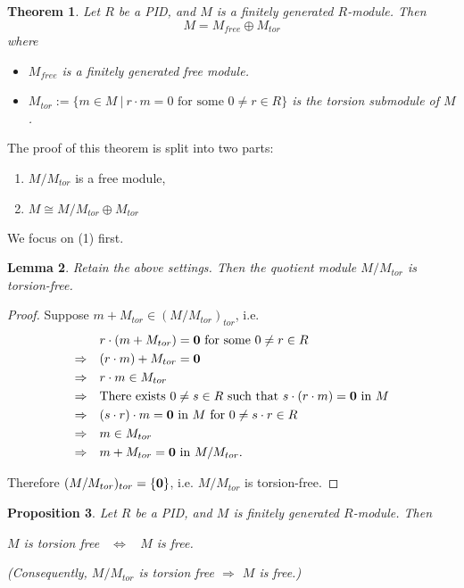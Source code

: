 \documentclass[12pt]{amsbook}
\newtheorem{theorem}{Theorem}[section]
\newtheorem{lemma}[theorem]{Lemma}
\newtheorem{proposition}[theorem]{Proposition}
\begin{document}
\begin{theorem}
    Let $R$ be a PID, and $M$ is a finitely generated $R$-module. Then
    $$M = M_{free}\oplus M_{tor}$$
    where
    \begin{itemize}
        \item $M_{free}$ is a finitely generated free module.
        \item $M_{tor}:=\{m\in M\ |\ r\cdot m=0\text{ for some }0\neq r\in R\}$ is the torsion submodule of $M$.
    \end{itemize}
\end{theorem}

The proof of this theorem is split into two parts:
\begin{enumerate}
    \item $M/M_{tor}$ is a free module,
    \item $M\cong M/M_{tor}\oplus M_{tor}$
\end{enumerate}

\medskip
We focus on (1) first. 
\begin{lemma}
Retain the above settings. Then the quotient module $M/M_{tor}$ is torsion-free.
\end{lemma}
\begin{proof}
Suppose $m+M_{tor}\in (M/M_{tor})_{tor}$, i.e.
    \begin{align*}
        &\quad r\cdot (m+M_{tor})={\bf 0}\text{ for some }0\neq r\in R\\
        \Rightarrow &\quad(r\cdot m)+M_{tor}={\bf 0}\\
        \Rightarrow &\quad r\cdot m\in M_{tor}\\
        \Rightarrow &\quad\text{There exists }0\neq s\in R\text{ such that }s\cdot(r\cdot m)={\bf 0}\text{ in }M\\
        \Rightarrow &\quad(s\cdot r)\cdot m={\bf 0}\text{ in }M\ \text{for}\ 0 \neq s\cdot r \in R\\
        \Rightarrow &\quad m\in M_{tor}\\
        \Rightarrow &\quad m+M_{tor}={\bf 0}\text{ in }M/M_{tor}.
    \end{align*}

    
    Therefore $(M/M_{tor})_{tor}=\{{\bf 0}\}$, i.e. $M/M_{tor}$ is torsion-free.
\end{proof}

\begin{proposition}
    Let $R$ be a PID, and $M$ is finitely generated $R$-module. Then
    \begin{center}
        $M$ is torsion free \ $\Leftrightarrow$ \ $M$ is free.
    \end{center}
    (Consequently, $M/M_{tor}$ is torsion free $\Rightarrow$ $M$ is free.)
\end{proposition}
\end{document}
